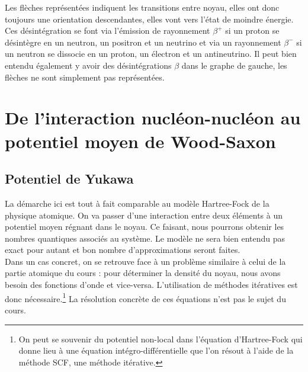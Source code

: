 Les flèches représentées indiquent les transitions entre noyau, elles ont donc toujours une orientation descendantes, elles vont vers l'état de moindre énergie. Ces désintégration se font via l'émission de rayonnement $\beta^+$ si un proton se désintègre en un neutron, un positron et un neutrino et via un rayonnement $\beta^-$ si un neutron se dissocie en un proton, un électron et un antineutrino. Il peut bien entendu également y avoir des désintégrations $\beta$ dans le graphe de gauche, les flèches ne sont simplement pas représentées.








\section{De l'interaction nucléon-nucléon au potentiel moyen de Wood-Saxon}
\subsection{Potentiel de Yukawa}


La démarche ici est tout à fait comparable au modèle Hartree-Fock de la physique atomique. On va passer d'une interaction entre deux éléments à un potentiel moyen régnant dans le noyau. Ce faisant, nous pourrons obtenir les nombres quantiques associés au système. Le modèle ne sera bien entendu pas exact pour autant et bon nombre d'approximations seront faites.\\

Dans un cas concret, on se retrouve face à un problème similaire à celui de la partie atomique du cours : pour déterminer la densité du noyau, nous avons besoin des fonctions d'onde et vice-versa. L'utilisation de méthodes itératives est donc nécessaire.\footnote{On peut se souvenir du potentiel non-local dans l'équation d'Hartree-Fock qui donne lieu à une équation intégro-différentielle que l'on résout à l'aide de la méthode SCF, une méthode itérative.} La résolution concrète de ces équations n'est pas le sujet du cours.\\

